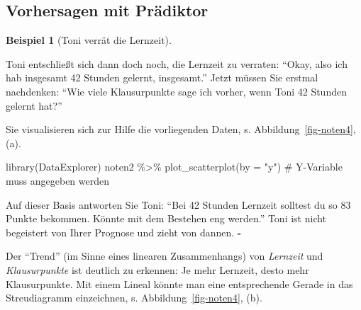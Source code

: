 \documentclass[
  letterpaper,
  twoside,
  open=any]{scrbook}
\newenvironment{Shaded}{\begin{snugshade}}{\end{snugshade}}
\newcommand{\AttributeTok}[1]{\textcolor[rgb]{0.40,0.45,0.13}{#1}}
\newcommand{\CommentTok}[1]{\textcolor[rgb]{0.37,0.37,0.37}{#1}}
\newcommand{\FunctionTok}[1]{\textcolor[rgb]{0.28,0.35,0.67}{#1}}
\newcommand{\NormalTok}[1]{\textcolor[rgb]{0.00,0.23,0.31}{#1}}
\newcommand{\SpecialCharTok}[1]{\textcolor[rgb]{0.37,0.37,0.37}{#1}}
\newcommand{\StringTok}[1]{\textcolor[rgb]{0.13,0.47,0.30}{#1}}
\theoremstyle{definition}
\theoremstyle{definition}
\newtheorem{example}{Beispiel}[chapter]
\theoremstyle{definition}
\theoremstyle{remark}
\begin{document}
\subsection{Vorhersagen mit
Prädiktor}\label{vorhersagen-mit-pruxe4diktor}

\begin{example}[Toni verrät die
Lernzeit]\protect\hypertarget{exm-noten3}{}\label{exm-noten3}

Toni entschließt sich dann doch noch, die Lernzeit zu verraten:
\enquote{Okay, also ich hab insgesamt 42 Stunden gelernt, insgesamt.}
Jetzt müssen Sie erstmal nachdenken: \enquote{Wie viele Klausurpunkte
sage ich vorher, wenn Toni 42 Stunden gelernt hat?}

Sie visualisieren sich zur Hilfe die vorliegenden Daten, s.
Abbildung~\ref{fig-noten4}, (a).

\begin{Shaded}
\begin{Highlighting}[]
\FunctionTok{library}\NormalTok{(DataExplorer)}
\NormalTok{noten2 }\SpecialCharTok{\%\textgreater{}\%} 
  \FunctionTok{plot\_scatterplot}\NormalTok{(}\AttributeTok{by =} \StringTok{"y"}\NormalTok{)  }\CommentTok{\# Y{-}Variable muss angegeben werden}
\end{Highlighting}
\end{Shaded}

Auf dieser Basis antworten Sie Toni: \enquote{Bei 42 Stunden Lernzeit
solltest du so 83 Punkte bekommen. Könnte mit dem Bestehen eng werden.}
Toni ist nicht begeistert von Ihrer Prognose und zieht von dannen.
\(\square\)

\end{example}

Der \enquote{Trend} (im Sinne eines linearen Zusammenhangs) von
\emph{Lernzeit} und \emph{Klausurpunkte} ist deutlich zu erkennen: Je
mehr Lernzeit, desto mehr Klausurpunkte. Mit einem Lineal könnte man
eine entsprechende Gerade in das Streudiagramm einzeichnen, s.
Abbildung~\ref{fig-noten4}, (b).
\end{document}
